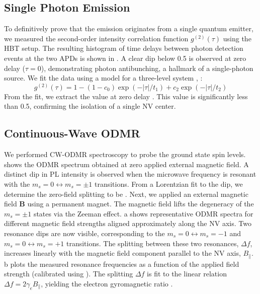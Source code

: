 \documentclass[aps,prb,twocolumn,superscriptaddress,floatfix,longbibliography,citeautoscript]{revtex4-2}
\begin{document}
\subsection{\label{sec:results_g2}Single Photon Emission}
To definitively prove that the emission originates from a single quantum emitter, we measured the second-order intensity correlation function $g^{(2)}(\tau)$ using the HBT setup.
The resulting histogram of time delays between photon detection events at the two APDs is shown in .
A clear dip below 0.5 is observed at zero delay ($\tau=0$), demonstrating photon antibunching, a hallmark of a single-photon source.
We fit the data using a model for a three-level system , : %
\begin{equation}
    g^{(2)}(\tau) = 1 - (1 - c_0) \exp(-|\tau|/t_1) + c_2 \exp(-|\tau|/t_2)
    \label{eq:g2_fit}
\end{equation}
From the fit, we extract the value at zero delay .
This value is significantly less than 0.5, confirming the isolation of a single NV center.

\subsection{\label{sec:results_cwodmr}Continuous-Wave ODMR}
We performed CW-ODMR spectroscopy to probe the ground state spin levels.
 shows the ODMR spectrum obtained at zero applied external magnetic field.
A distinct dip in PL intensity is observed when the microwave frequency is resonant with the $m_s=0 \leftrightarrow m_s=\pm 1$ transitions.
From a Lorentzian fit to the dip, we determine the zero-field splitting to be .
Next, we applied an external magnetic field $\mathbf{B}$ using a permanent magnet.
The magnetic field lifts the degeneracy of the $m_s = \pm 1$ states via the Zeeman effect.
a shows representative ODMR spectra for different magnetic field strengths aligned approximately along the NV axis.
Two resonance dips are now visible, corresponding to the $m_s=0 \leftrightarrow m_s=-1$ and $m_s=0 \leftrightarrow m_s=+1$ transitions.
The splitting between these two resonances, $\Delta f$, increases linearly with the magnetic field component parallel to the NV axis, $B_\parallel$.
b plots the measured resonance frequencies as a function of the applied field strength (calibrated using ).
The splitting $\Delta f$ is fit to the linear relation $\Delta f = 2 \gamma_e B_\parallel$, yielding the electron gyromagnetic ratio .
\end{document}
